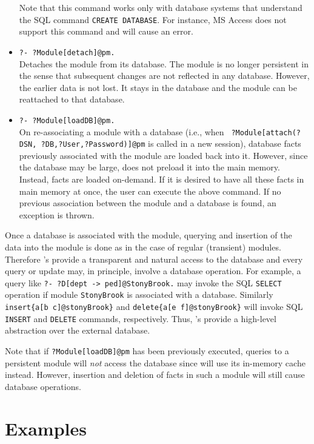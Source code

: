 \begin{itemize}
  Note that this command works only with database systems that understand
  the SQL command {\tt CREATE DATABASE}. For instance, MS Access does not
  support this command and will cause an error.
\item {\tt ?- ?Module[detach]@pm.}\\
  Detaches the module from its database. The module is no longer persistent
  in the sense that subsequent changes are not reflected in any database.
  However, the earlier data is not lost. It stays in the database and the
  module can be reattached to that database.
\item {\tt ?- ?Module[loadDB]@pm.}\\
  On re-associating a module with a database (i.e., when {\tt
    ?Module[attach(?DSN, ?DB,?User,?Password)]@pm} is called in a new
  \FLORA session), database facts previously associated with the module are
  loaded back into it.  However, since the database may be large, \FLORA
  does not preload it into the main memory. Instead, facts are loaded
  on-demand.  If it is desired to have all these facts in main
  memory at once, the user can execute the above command. If no previous
  association between the module and a database is found, an exception is
  thrown.
\end{itemize}



Once a database is associated with the module, querying and insertion of
the data into the module is done as in the case of regular (transient)
modules.  Therefore \psm's provide a transparent and natural access to the
database and every query or update may, in principle, involve a database
operation.  For example, a query like {\tt ?- ?D[dept -> ped]@StonyBrook.}
may invoke the SQL {\tt SELECT} operation if module {\tt StonyBrook} is
associated with a database.  Similarly {\tt  insert\{a[b \fd
  c]@stonyBrook\}} and {\tt delete\{a[e \fd f]@stonyBrook\}}  will invoke
SQL {\tt INSERT} and {\tt DELETE} commands, respectively. Thus, \psm's provide
a high-level abstraction over the external database.

Note that if {\tt ?Module[loadDB]@pm} has been previously executed,
queries to a persistent module will \emph{not} access the database since
\FLORA will use its in-memory cache instead. However, insertion and
deletion of facts in such a module will still cause database operations.

\section{Examples}

